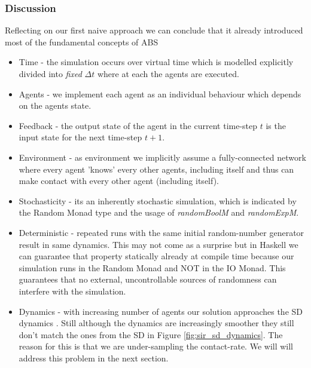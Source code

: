 \subsubsection{Discussion}
Reflecting on our first naive approach we can conclude that it already introduced most of the fundamental concepts of ABS
\begin{itemize}
	\item Time - the simulation occurs over virtual time which is modelled explicitly divided into \textit{fixed} $\Delta t$ where at each the agents are executed.
	\item Agents - we implement each agent as an individual behaviour which depends on the agents state.
	\item Feedback - the output state of the agent in the current time-step $t$ is the input state for the next time-step $t+1$.
	\item Environment - as environment we implicitly assume a fully-connected network where every agent 'knows' every other agents, including itself and thus can make contact with every other agent (including itself).
	\item Stochasticity - its an inherently stochastic simulation, which is indicated by the Random Monad type and the usage of \textit{randomBoolM} and \textit{randomExpM}.
	\item Deterministic - repeated runs with the same initial random-number generator result in same dynamics. This may not come as a surprise but in Haskell we can guarantee that property statically already at compile time because our simulation runs in the Random Monad and NOT in the IO Monad. This guarantees that no external, uncontrollable sources of randomness can interfere with the simulation.
	\item Dynamics - with increasing number of agents our solution approaches the SD dynamics \cite{macal_agent-based_2010}. Still although the dynamics are increasingly smoother they still don't match the ones from the SD in Figure \ref{fig:sir_sd_dynamics}. The reason for this is that we are under-sampling the contact-rate. We will will address this problem in the next section.
\end{itemize}

